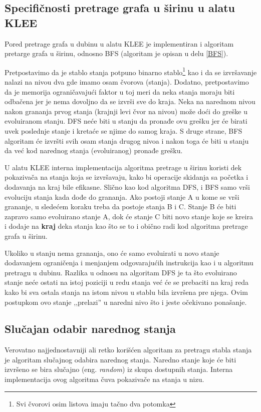 \documentclass[12pt,oneside]{memoir}
\begin{document}
\subsection{Specifičnosti pretrage grafa u širinu u alatu KLEE} 
Pored pretrage grafa u dubinu u alatu KLEE je implementiran i algoritam pretarge grafa u širinu, odnosno BFS (algoritam je opisan u delu \ref{BFS}).

Pretpostavimo da je stablo stanja potpuno binarno stablo\footnote[3]{Svi čvorovi osim listova imaju tačno dva potomka} kao i da se izvršavanje nalazi na nivou dva gde imamo osam čvorova (stanja). Dodatno, pretpostavimo da je memorija ograničavajući faktor u toj meri da neka stanja moraju biti odbačena jer je nema dovoljno da se izvrši sve do kraja. Neka na narednom nivou nakon grananja prvog stanja (krajnji levi čvor na nivou) može doći do greške u evoluiranom stanju. DFS neće biti u stanju da pronađe ovu grešku jer će birati uvek poslednje stanje i kretaće se njime do samog kraja. S druge strane, BFS algoritam će izvršti svih osam stanja drugog nivoa i nakon toga će biti u stanju da već kod narednog stanja (evoluiranog) pronađe grešku. 

U alatu KLEE interna implementacija algoritma pretrage u širinu koristi dek pokazivača na stanja koja se izvršavaju, kako bi operacije skidanja sa početka i dodavanja na kraj bile efikasne. Slično kao kod algoritma DFS, i BFS samo vrši evoluciju stanja kada dođe do grananja. Ako postoji stanje A u kome se vrši grananje, u sledećem koraku treba da postoje stanja B i C. Stanje B će biti zapravo samo evoluirano stanje A, dok će stanje C biti novo stanje koje se kreira i dodaje na \textbf{kraj} deka stanja kao što se to i obično radi kod algoritma pretrage grafa u širinu. 

Ukoliko u stanju nema grananja, ono će samo evoluirati u novo stanje dodavanjem ograničenja i menjanjem odgovarajućih instrukcija kao i u algoritmu pretragu u dubinu. Razlika u odnosu na algoritam DFS je ta što evoluirano stanje neće ostati na istoj poziciji u redu stanja već će se prebaciti na kraj reda kako bi sva ostala stanja na istom nivou u stablu bila izvršena pre njega. Ovim postupkom ovo stanje ,,prelazi'' u naredni nivo što i jeste očekivano ponašanje. 

\subsection{Slučajan odabir narednog stanja} 
Verovatno najjednostavniji ali retko korišćen algoritam za pretragu stabla stanja je algoritam slučajnog odabira narednog stanja. Naredno stanje koje će biti izvršeno se bira slučajno (eng. \textit{random}) iz skupa dostupnih stanja. Interna implementacija ovog algoritma čuva pokazivače na stanja u nizu. 
\end{document}
